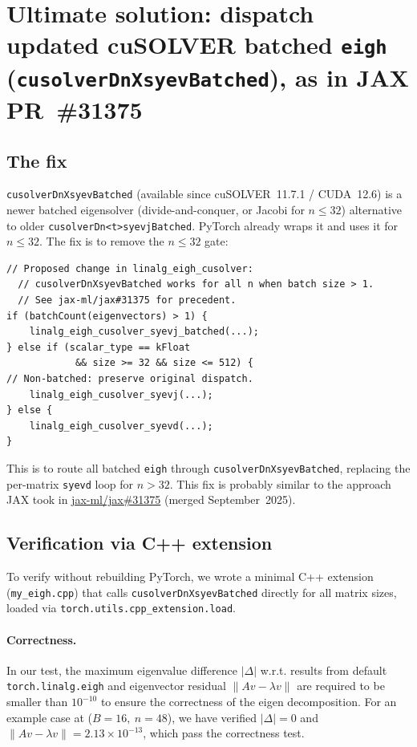 \documentclass[10pt, letterpaper]{article}
\begin{document}
\section{Ultimate solution: dispatch updated cuSOLVER batched
  \texttt{eigh} (\texttt{cusolverDnXsyevBatched}),
  as in JAX PR~\#31375}
\label{sec:fix}

\subsection{The fix}

\texttt{cusolverDnXsyevBatched} (available since cuSOLVER~11.7.1 /
CUDA~12.6) is a newer batched eigensolver (divide-and-conquer, or Jacobi for $n\le32$) alternative to older \texttt{cusolverDn<t>syevjBatched}. PyTorch already wraps it and uses it
for $n \le 32$. The fix is to remove the $n \le 32$ gate:

\begin{lstlisting}
// Proposed change in linalg_eigh_cusolver:
  // cusolverDnXsyevBatched works for all n when batch size > 1.
  // See jax-ml/jax#31375 for precedent.
if (batchCount(eigenvectors) > 1) {
    linalg_eigh_cusolver_syevj_batched(...);
} else if (scalar_type == kFloat
            && size >= 32 && size <= 512) {
// Non-batched: preserve original dispatch.
    linalg_eigh_cusolver_syevj(...);
} else {
    linalg_eigh_cusolver_syevd(...);
}
\end{lstlisting}

This is to route all batched \texttt{eigh} through
\texttt{cusolverDnXsyevBatched}, replacing the per-matrix
\texttt{syevd} loop for $n>32$. This fix is probably similar to the approach JAX took in
\href{https://github.com/jax-ml/jax/pull/31375}{jax-ml/jax\#31375}
(merged September~2025).

\subsection{Verification via C++ extension}

To verify without rebuilding PyTorch, we wrote a minimal C++ extension
(\texttt{my\_eigh.cpp}) that calls \texttt{cusolverDnXsyevBatched}
directly for all matrix sizes, loaded via
\texttt{torch.utils.cpp\_extension.load}.

\paragraph{Correctness.}
In our test, the maximum eigenvalue difference $|\Delta|$ w.r.t. results from default \texttt{torch.linalg.eigh} and eigenvector residual
$\|Av - \lambda v\|$ are required to be smaller than $10^{-10}$ to ensure the correctness of the eigen decomposition. For an example case at ($B=16,\ n=48$), we have verified $|\Delta|=0$ and $\|Av - \lambda v\|=2.13\times10^{-13}$, which pass the correctness test.
\end{document}
